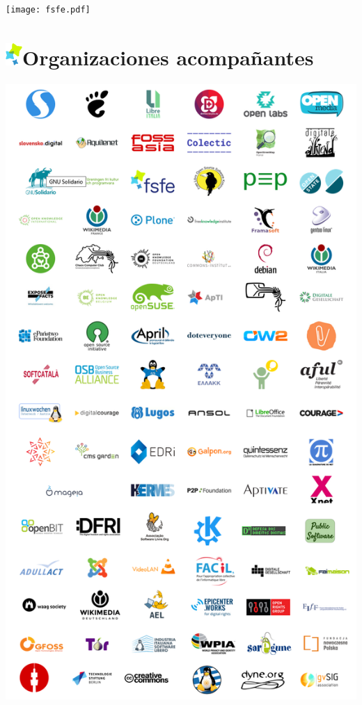 \documentclass[10pt,foldmark,tumble]{leaflet}
\begin{document}
\vspace{1em}

\centering \texttt{[image: fsfe.pdf]}

\newpage
\section{\includegraphics{item.png}Organizaciones acompañantes}
\vspace{1em}
\includegraphics[scale=0.40]{colab.png} 


\end{document}
